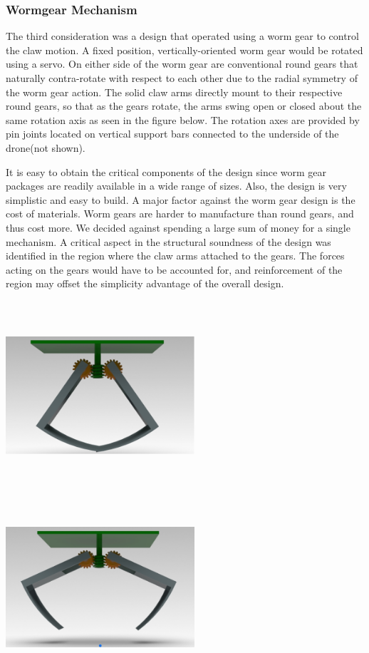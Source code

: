 		\subsubsection{Wormgear Mechanism}
			The third consideration was a design that operated using a worm gear to control the claw motion. A fixed position, vertically-oriented worm gear would be rotated using a servo. On either side of the worm gear are conventional round gears that naturally contra-rotate with respect to each other due to the radial symmetry of the worm gear action. The solid claw arms directly mount to their respective round gears, so that as the gears rotate, the arms swing open or closed about the same rotation axis as seen in the figure below. The rotation axes are provided by pin joints located on vertical support bars connected to the underside of the drone(not shown).

			It is easy to obtain the critical components of the design since worm gear packages are readily available in a wide range of sizes. Also, the design is very simplistic and easy to build. A major factor against the worm gear design is the cost of materials. Worm gears are harder to manufacture than round gears, and thus cost more. We decided against spending a large sum of money for a single mechanism. A critical aspect in the structural soundness of the design was identified in the region where the claw arms attached to the gears. The forces acting on the gears would have to be accounted for, and reinforcement of the region may offset the simplicity advantage of the overall design.
			
			\includegraphics[width = 7cm, height = 7cm]{img/PL/worm2.PNG}
			\includegraphics[width = 7cm, height = 7cm]{img/PL/worm1.PNG}
			
